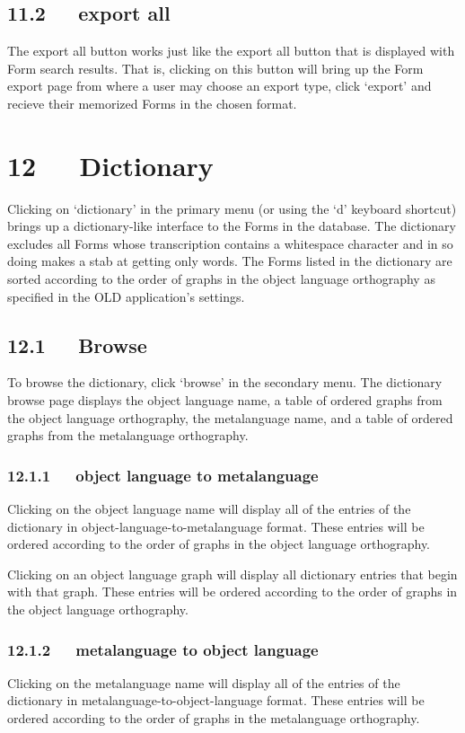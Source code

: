\documentclass[letterpaper,10pt,english]{sphinxmanual}
\begin{document}
\section{11.2   export all}
\label{user_guide:id22}
The export all button works just like the export all button that is displayed
with Form search results.  That is, clicking on this button will bring up the
Form export page from where a user may choose an export type, click `export' and
recieve their memorized Forms in the chosen format.


\chapter{12   Dictionary}
\label{user_guide:dictionary}
Clicking on `dictionary' in the primary menu (or using the `d' keyboard
shortcut) brings up a dictionary-like interface to the Forms in the database.
The dictionary excludes all Forms whose transcription contains a whitespace
character and in so doing makes a stab at getting only words.  The Forms listed
in the dictionary are sorted according to the order of graphs in the object
language orthography as specified in the OLD application's settings.


\section{12.1   Browse}
\label{user_guide:browse}
To browse the dictionary, click `browse' in the secondary menu.  The dictionary
browse page displays the object language name, a table of ordered graphs from
the object language orthography, the metalanguage name, and a table of ordered
graphs from the metalanguage orthography.


\subsection{12.1.1   object language to metalanguage}
\label{user_guide:object-language-to-metalanguage}
Clicking on the object language name will display all of the entries of the
dictionary in object-language-to-metalanguage format.  These entries will be
ordered according to the order of graphs in the object language orthography.

Clicking on an object language graph will display all dictionary entries that
begin with that graph.  These entries will be ordered according to the order of
graphs in the object language orthography.


\subsection{12.1.2   metalanguage to object language}
\label{user_guide:metalanguage-to-object-language}
Clicking on the metalanguage name will display all of the entries of the
dictionary in metalanguage-to-object-language format.  These entries will be
ordered according to the order of graphs in the metalanguage orthography.
\end{document}

